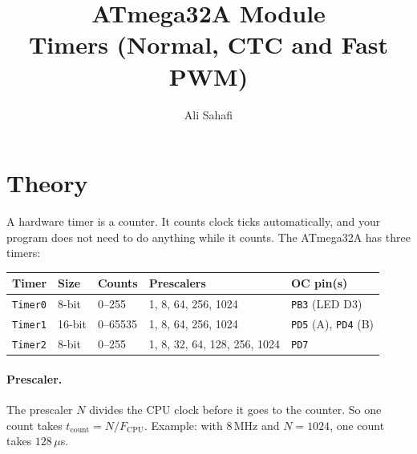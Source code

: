 \documentclass[11pt,a4paper]{article}
\title{ATmega32A Module \\ \Large Timers (Normal, CTC and Fast PWM)}
\author{Ali Sahafi}
\date{}
\newcommand{\code}[1]{\texttt{#1}}
\begin{document}
\maketitle

\section{Theory}

A hardware timer is a counter. It counts clock ticks automatically, and your
program does not need to do anything while it counts. The ATmega32A has three
timers:

\begin{center}
\begin{tabular}{lllll}
\toprule
\textbf{Timer} & \textbf{Size} & \textbf{Counts} & \textbf{Prescalers} & \textbf{OC pin(s)} \\
\midrule
\code{Timer0} & 8-bit  & 0--255   & 1, 8, 64, 256, 1024          & \code{PB3} (LED D3) \\
\code{Timer1} & 16-bit & 0--65535 & 1, 8, 64, 256, 1024          & \code{PD5} (A), \code{PD4} (B) \\
\code{Timer2} & 8-bit  & 0--255   & 1, 8, 32, 64, 128, 256, 1024 & \code{PD7} \\
\bottomrule
\end{tabular}
\end{center}

\paragraph{Prescaler.} The prescaler $N$ divides the CPU clock before it goes
to the counter. So one count takes $t_{\text{count}} = N / F_{\text{CPU}}$.
Example: with 8\,MHz and $N = 1024$, one count takes $128\,\mu$s.
\end{document}
